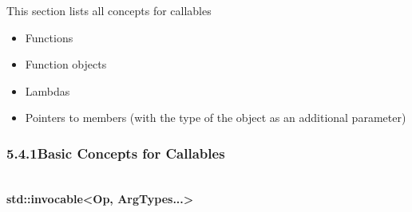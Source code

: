 
This section lists all concepts for callables

\begin{itemize}
\item
Functions

\item
Function objects

\item
Lambdas

\item
Pointers to members (with the type of the object as an additional parameter)
\end{itemize}

\subsubsection*{ 5.4.1\hspace{0.2cm}Basic Concepts for Callables}

\noindent
\hspace*{\fill} \\ %
\textbf{std::invocable<Op, ArgTypes...>}

